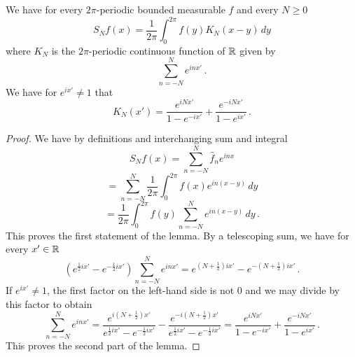 \begin{lemma}
\label{Dirichlet-kernel}
\leanok
{}
We have for every $2\pi$-periodic bounded measurable $f$ and every $N\ge 0$
\begin{equation}
    S_Nf(x)=\frac 1{2\pi}\int_{0}^{2\pi}f(y) K_N(x-y)\, dy
\end{equation}
where $K_N$ is the $2\pi$-periodic continuous function of
${\mathbb{R}}$ given by
\begin{equation}\label{eqksumexp}
\sum_{n=-N}^N e^{in x'}\, .
\end{equation}
We have for $e^{ix'}\neq 1$ that
\begin{equation}\label{eqksumhil}
    K_N(x')=\frac{e^{iNx'}}{1-e^{-ix'}}
      +\frac {e^{-iNx'}}{1-e^{ix'}} \, .
\end{equation}


\end{lemma}


\begin{proof}
\leanok
We have by definitions and interchanging sum and integral
   \begin{equation*}
        S_Nf(x)=\sum_{n=-N}^N \widehat{f}_n e^{inx}
    \end{equation*}
       \begin{equation*}
    =\sum_{n=-N}^N \frac 1{2\pi}\int_{0}^{2\pi}
    f(x) e^{in(x-y)}\, dy
    \end{equation*}
 \begin{equation}\label{eq-expsum}
     =\frac 1{2\pi}\int_{0}^{2\pi}
    f(y) \sum_{n=-N}^N e^{in(x-y)}\, dy\, .
 \end{equation}
This proves the first statement of the lemma.
By a telescoping sum, we have for every $x'\in {\mathbb{R}}$
\begin{equation}
    \left( e^{\frac 12 ix'}-e^{-\frac 12 ix'}\right) \sum_{n=-N}^N e^{inx'}= e^{(N+\frac 12) ix'}-e^{-(N+\frac 12) ix'}\, .
\end{equation}
If $e^{ix'}\neq 1$, the first factor on the left-hand side is not $0$ and we may divide by this factor to obtain
\begin{equation}
      \sum_{n=-N}^N e^{inx'}= \frac{e^{i(N+\frac 1 2)x'}}{e^{\frac 12 ix'}-e^{-\frac 12ix'}}
      -\frac{e^{-i(N+\frac 1 2)x'}}{e^{\frac 12 ix'}-e^{-\frac 12ix'}}
       =\frac{e^{iNx'}}{1-e^{-ix'}}
      +\frac {e^{-iNx'}}{1-e^{ix'}}\, .
\end{equation}
This proves the second part of the lemma.
\end{proof}

